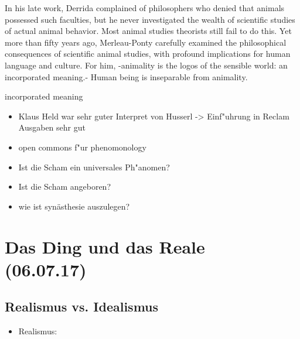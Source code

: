 \documentclass[emulatestandardclasses]{scrartcl}
\begin{document}
In his late work, Derrida complained of philosophers who denied that animals possessed such faculties, but he never investigated the wealth of scientific studies of actual animal behavior. Most animal studies theorists still fail to do this. Yet more than fifty years ago, Merleau-Ponty carefully examined the philosophical consequences of scientific animal studies, with profound implications for human language and culture. For him, -animality is the logos of the sensible world: an incorporated meaning.- Human being is inseparable from animality. 

incorporated meaning


\begin{itemize}
  \item Klaus Held war sehr guter Interpret von Husserl -> Einf"uhrung in Reclam Ausgaben sehr gut
  \item open commons f"ur phenomonology
  \item Ist die Scham ein universales Ph"anomen?
  \item Ist die Scham angeboren?
  \item wie ist synästhesie auszulegen?
\end{itemize}



\section{Das Ding und das Reale\\(06.07.17)}

\subsection{Realismus vs. Idealismus}

\begin{itemize}
  \item Realismus: 
\end{itemize}


\newpage
%


\end{document}
